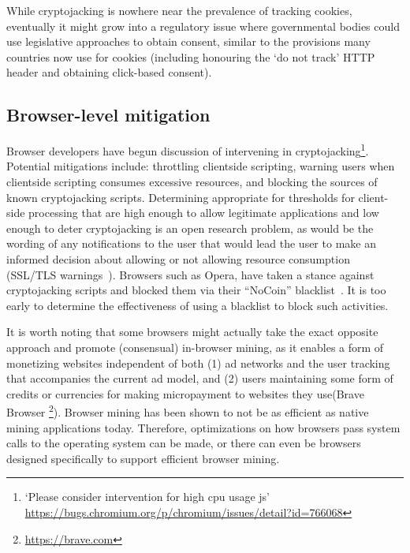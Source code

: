 While cryptojacking is nowhere near the prevalence of tracking cookies, eventually it might grow into a regulatory issue where governmental bodies could use legislative approaches to obtain consent, similar to the provisions many countries now use for cookies (including honouring the `do not track' HTTP header and obtaining click-based consent).


\subsection{Browser-level mitigation}

Browser developers have begun discussion of intervening in cryptojacking\footnote{`Please consider intervention for high cpu usage js' \url{https://bugs.chromium.org/p/chromium/issues/detail?id=766068}}. Potential mitigations include: throttling clientside scripting, warning users when clientside scripting consumes excessive resources, and blocking the sources of known cryptojacking scripts. Determining appropriate for thresholds for client-side processing that are high enough to allow legitimate applications and low enough to deter cryptojacking is an open research problem, as would be the wording of any notifications to the user that would lead the user to make an informed decision about allowing or not allowing resource consumption (\cf SSL/TLS warnings~\cite{SEAAC09,SHB11,Acer:2017:WWR:3133956.3134007}).
Browsers such as Opera, have taken a stance against cryptojacking scripts and blocked them via their ``NoCoin'' blacklist~\cite{operanocoin}. It is too early to determine the effectiveness of using a blacklist to block such activities.  

It is worth noting that some browsers might actually take the exact opposite approach and promote (consensual) in-browser mining, as it enables a form of monetizing websites independent of both (1) ad networks and the user tracking that accompanies the current ad model, and (2) users maintaining some form of credits or currencies for making micropayment to websites they use(\eg Brave Browser \footnote{\url{https://brave.com}}). Browser mining has been shown to not be as efficient as native mining applications today. Therefore, optimizations on how browsers pass system calls to the operating system can be made, or there can even be browsers designed specifically to support efficient browser mining. 


